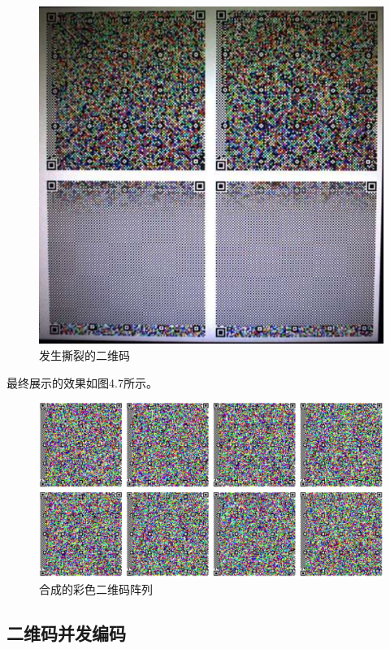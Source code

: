 \begin{figure}[!htbp]
\centering
\includegraphics[scale=0.6]{figures/QR_Cap_NV.png}
\caption{发生撕裂的二维码}
\end{figure}

最终展示的效果如图4.7所示。

\begin{figure}[!htbp]
\centering
\includegraphics[scale=0.8]{figures/QR_Dp.png}
\caption{合成的彩色二维码阵列}
\end{figure}

\subsection{二维码并发编码}

